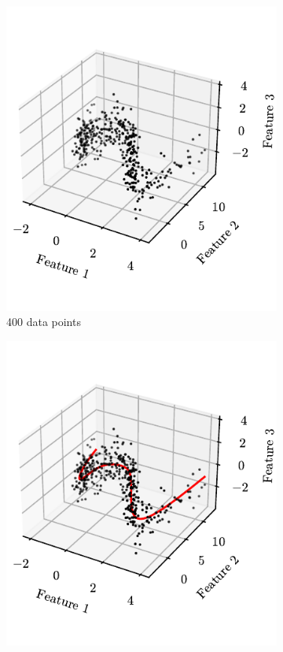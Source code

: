 \begin{figure}
    \centering
    \begin{subfigure}{0.49\textwidth}  %
        \includegraphics[width=\textwidth]{images/MachineLearning/LinearRegressiondData.pdf}
        \caption{400 data points}
        \label{fig:LinearRegressiondData}
    \end{subfigure}
    \begin{subfigure}{0.49\textwidth}  %
        \includegraphics[width=\textwidth]{images/MachineLearning/LinearRegression.pdf}

\end{subfigure}
\end{figure}
